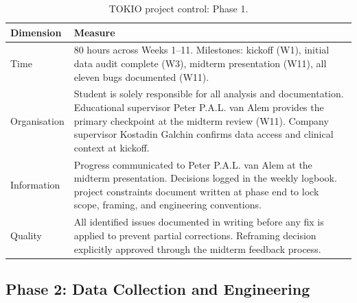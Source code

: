 \documentclass[11pt,a4paper]{article}
\begin{document}
\begin{table}[H]
  \centering
  \caption{TOKIO project control: Phase 1.}
  \label{tab:tokio1}
  \small
  \begin{tabular}{p{2.2cm} p{11cm}}
    \toprule
    \textbf{Dimension} & \textbf{Measure} \\
    \midrule
    Time         & 80 hours across Weeks 1--11. Milestones: kickoff (W1), initial data audit complete (W3), midterm presentation (W11), all eleven bugs documented (W11). \\
    Organisation & Student is solely responsible for all analysis and documentation. Educational supervisor Peter P.A.L. van Alem provides the primary checkpoint at the midterm review (W11). Company supervisor Kostadin Galchin confirms data access and clinical context at kickoff. \\
    Information  & Progress communicated to Peter P.A.L. van Alem at the midterm presentation. Decisions logged in the weekly logbook. project constraints document written at phase end to lock scope, framing, and engineering conventions. \\
    Quality      & All identified issues documented in writing before any fix is applied to prevent partial corrections. Reframing decision explicitly approved through the midterm feedback process. \\
    \bottomrule
  \end{tabular}
\end{table}

\subsection{Phase 2: Data Collection and Engineering}
\end{document}
